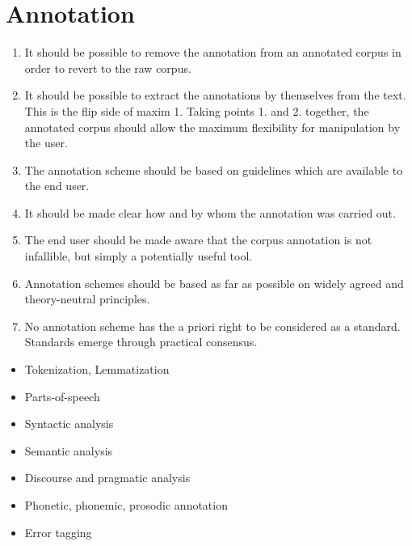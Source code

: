 \documentclass[a4paper,landscape,headrule,footrule,xetex]{foils}
\begin{document}
\section{Annotation}



\begin{enumerate}
\item It should be possible to remove the annotation
from an annotated corpus in order to revert to
the raw corpus.
\item It should be possible to extract the annotations
by themselves from the text. This is the flip side
of maxim 1. Taking points 1. and 2. together, the
annotated corpus should allow the maximum
flexibility for manipulation by the user.
\item The annotation scheme should be based on
guidelines which are available to the end user.
\item It should be made clear how and by whom the
annotation was carried out.
\item The end user should be made aware that the
corpus annotation is not infallible, but simply a
potentially useful tool.
\item Annotation schemes should be based as far as
possible on widely agreed and theory-neutral
principles.
\item No annotation scheme has the a priori right to
be considered as a standard. Standards emerge
through practical consensus.
\end{enumerate}

\begin{itemize}
\item  Tokenization, Lemmatization
\item  Parts-of-speech
\item  Syntactic analysis
\item  Semantic analysis
\item  Discourse and pragmatic analysis
\item  Phonetic, phonemic, prosodic annotation
\item  Error tagging
\end{itemize}
\end{document}
